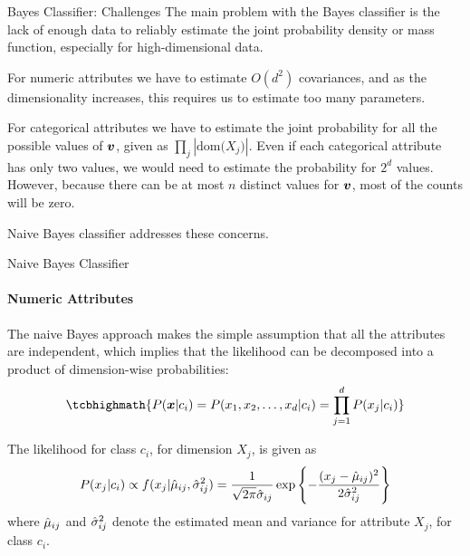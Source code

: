   \begin{frame}{Bayes Classifier: Challenges}
The main problem with the Bayes classif\/{i}er is the lack of enough
data to reliably estimate the joint probability density or mass
function, especially for high-dimensional data. 

\bigskip
For
numeric attributes we have to estimate $O(d^2)$ covariances, and
as the dimensionality increases, this requires us to estimate too
many parameters. 

\medskip
For categorical attributes we have to estimate
the joint probability for all the possible values of ${\boldsymbol v}$, given
as $\prod_{j} |\text{dom}\bigl(X_{j}\bigr)|$. Even if each categorical attribute
has only two values, we would need to estimate the probability for
$2^d$ values. However, because there can be at most $n$ distinct
values for ${\boldsymbol v}$, most of the counts will be zero. 

\medskip
Naive Bayes classifier addresses these concerns.
\end{frame}

\ifdefined\wox \begin{frame} \titlepage \end{frame} \fi

\begin{frame}{Naive Bayes Classif\/{i}er}
\framesubtitle{Numeric Attributes}
The naive Bayes approach makes the simple assumption
that all the attributes are independent, which
implies that the likelihood
can be decomposed into a product of dimension-wise probabilities:
\begin{align*}
\tcbhighmath{
P(\bx | c_i) = P(x_1,x_2,\ldots,x_d | c_i) = \prod_{j=1}^d P(x_{j} |
c_i) 
}
\end{align*}

 The
likelihood for class $c_i$, for dimension $X_{j}$, is given as
\begin{align*}
    P(x_{j}|c_i) \propto f(x_{j} | \hat{\mu}_{ij}, \hat{\sigma}_{ij}^2)  = {1\over
    \sqrt{2\pi}\hat{\sigma}_{ij}}\exp\left\{ -{(x_{j} - \hat{\mu}_{ij})^2 \over
    2\hat{\sigma}_{ij}^2}\right\}
\end{align*}
where $\hat{\mu}_{ij}$ and
$\hat{\sigma}_{ij}^2$ denote the estimated
mean and variance for attribute $X_{j}$,
for class $c_i$.
\end{frame}


